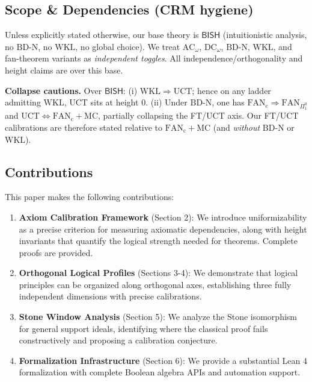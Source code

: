 \documentclass[11pt]{article}
\theoremstyle{plain}
\theoremstyle{definition}
\newcommand{\DCw}{\mathrm{DC}_\omega}
\newcommand{\ACw}{\mathrm{AC}_\omega}
\newcommand{\UCT}{\mathrm{UCT}}
\newcommand{\BISH}{\mathsf{BISH}}
\newcommand{\BDN}{\mathrm{BD\mbox{-}N}}
\newcommand{\MC}{\mathrm{MC}}            %
\newcommand{\WKL}{\mathrm{WKL}}
\newcommand{\FTc}{\mathrm{FAN}_{\mathrm{c}}}  %
\newcommand{\FANPiO}{\mathrm{FAN}_{\Pi^0_1}}
\begin{document}
\subsection{Scope \& Dependencies (CRM hygiene)}\label{subsec:scope}
Unless explicitly stated otherwise, our base theory is \(\BISH\) (intuitionistic analysis, no \(\BDN\), no \(\WKL\), no global choice). We treat \(\ACw\), \(\DCw\), \(\BDN\), \(\WKL\), and fan-theorem variants as \emph{independent toggles}. All independence/orthogonality and height claims are over this base.

\begin{warningbox}
\textbf{Collapse cautions.} Over \(\BISH\): (i) \(\WKL \Rightarrow \UCT\); hence on any ladder admitting \(\WKL\), \(\UCT\) sits at height \(0\). (ii) Under \(\BDN\), one has \(\FTc \Rightarrow \FANPiO\) and \(\UCT \iff \FTc+\MC\), partially collapsing the FT/UCT axis. Our FT/UCT calibrations are therefore stated relative to \(\FTc+\MC\) (and \emph{without} \(\BDN\) or \(\WKL\)).
\end{warningbox}

\subsection{Contributions}

This paper makes the following contributions:

\begin{enumerate}
\item \textbf{Axiom Calibration Framework} (Section 2): We introduce uniformizability as a precise criterion for measuring axiomatic dependencies, along with height invariants that quantify the logical strength needed for theorems. Complete proofs are provided.

\item \textbf{Orthogonal Logical Profiles} (Sections 3-4): We demonstrate that logical principles can be organized along orthogonal axes, establishing three fully independent dimensions with precise calibrations.

\item \textbf{Stone Window Analysis} (Section 5): We analyze the Stone isomorphism for general support ideals, identifying where the classical proof fails constructively and proposing a calibration conjecture.

\item \textbf{Formalization Infrastructure} (Section 6): We provide a substantial Lean 4 formalization with complete Boolean algebra APIs and automation support.
\end{enumerate}
\end{document}
